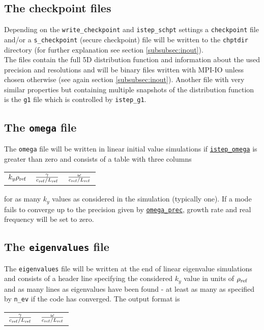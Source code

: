 \documentclass[12pt]{article}
\begin{document}
\subsection{The checkpoint files}
\label{subsec:chpt-files}
Depending on the {\tt write\_checkpoint} and {\tt istep\_schpt} settings a {\tt checkpoint} file
and/or a {\tt s\_checkpoint} (secure checkpoint) file will be written to the {\tt chptdir}
directory (for further explanation see section \ref{subsubsec:inout}). \\
The files contain the full 5D distribution function and information about the used precision and
resolutions and will be binary files written with MPI-IO unless chosen otherwise
(see again section \ref{subsubsec:inout}). Another file with very similar properties but
containing multiple snapshots of the distribution function is the {\tt g1} file which is
controlled by {\tt istep\_g1}.

\subsection{The \texttt{omega} file}
\label{subsec:omega-file}

The {\tt omega} file will be written in linear initial value simulations
if \hyperlink{istep_omega}{\tt istep\_omega} is greater than
zero and consists of a table with three columns
\begin{center}
\begin{tabular}{lll}
$k_y\rho_{\rm ref}$ & $\frac{\gamma}{c_{\rm ref}/L_{\rm ref}}$ & $\frac{\omega}{c_{\rm ref} / L_{\rm ref}}$
\end{tabular}
\end{center}
for as many $k_y$ values as considered in the simulation (typically one).
If a mode fails to converge up to the precision given by \hyperlink{omega_prec}{\tt omega\_prec},
growth rate and real frequency will be set to zero.

\subsection{The \texttt{eigenvalues} file}
\label{subsec:eigenvalues-file}

The {\tt eigenvalues} file will be written at the end of linear eigenvalue simulations
and consists of a header line specifying the considered $k_y$ value in units of $\rho_{\rm ref}$ and
as many lines as eigenvalues have been found - at least as many as specified by {\tt n\_ev}
if the code has converged. The output format is
\begin{center}
\begin{tabular}{ll}
$\frac{\gamma}{c_{\rm ref}/L_{\rm ref}}$ & $\frac{\omega}{c_{\rm ref} / L_{\rm ref}}$
\end{tabular}
\end{center}
\end{document}
